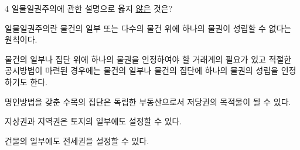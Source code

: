 \begin{question}{4}
일물일권주의에 관한 설명으로 옳지 \uline{않은} 것은?
\begin{choices}
  \item 일물일권주의란 물건의 일부 또는 다수의 물건 위에 하나의 물권이 성립할 수 없다는 원칙이다.
  \item 물건의 일부나 집단 위에 하나의 물권을 인정하여야 할 거래계의 필요가 있고 적절한 공시방법이 마련된 경우에는 물건의 일부나 물건의 집단에 하나의 물권의 성립을 인정하기도 한다.
  \item 명인방법을 갖춘 수목의 집단은 독립한 부동산으로서 저당권의 목적물이 될 수 있다.
  \item 지상권과 지역권은 토지의 일부에도 설정할 수 있다.
  \item 건물의 일부에도 전세권을 설정할 수 있다.
\end{choices}
\end{question}
